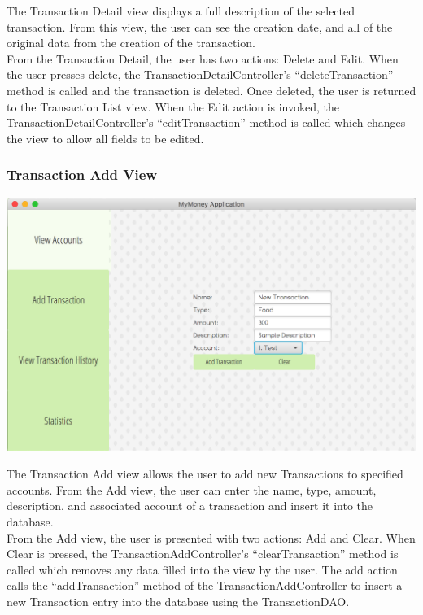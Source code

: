 \documentclass[12pt]{article}
\begin{document}
The Transaction Detail view displays a full description of the selected
transaction. From this view, the user can see the creation date, and all of the
original data from the creation of the transaction.\\

From the Transaction Detail, the user has two actions: Delete and Edit.
When the user presses delete, the TransactionDetailController's ``deleteTransaction'' method
is called and the transaction is deleted. Once deleted, the user is returned to
the Transaction List view. When the Edit action is invoked, the
TransactionDetailController's ``editTransaction'' method is called which
changes the view to allow all fields to be edited.

\subsubsection{Transaction Add View}

\includegraphics[scale=0.2]{transactionadd}

The Transaction Add view allows the user to add new Transactions to specified accounts.
From the Add view, the user can enter the name, type, amount, description, and associated account
of a transaction and insert it into the database.\\

From the Add view, the user is presented with two actions: Add and Clear.
When Clear is pressed, the TransactionAddController's ``clearTransaction''
method is called which removes any data filled into the view by the user.
The add action calls the ``addTransaction'' method of the TransactionAddController
to insert a new Transaction entry into the database using the TransactionDAO.
\end{document}
